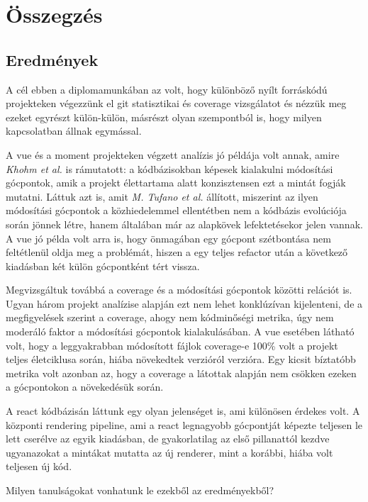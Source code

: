 \chapter{Összegzés}
\label{ch:sum}

\section{Eredmények}

A cél ebben a diplomamunkában az volt, hogy különböző nyílt forráskódú projekteken végezzünk el git statisztikai és coverage vizsgálatot és nézzük meg ezeket egyrészt külön-külön, másrészt olyan szempontból is, hogy milyen kapcsolatban állnak egymással.

A vue és a moment projekteken végzett analízis jó példája volt annak, amire \textit{Khohm et al.}\cite{khomh} is rámutatott: a kódbázisokban képesek kialakulni módosítási gócpontok, amik a projekt élettartama alatt konzisztensen ezt a mintát fogják mutatni. Láttuk azt is, amit \textit{M. Tufano et al.}\cite{codeSmells} állított, miszerint az ilyen módosítási gócpontok a közhiedelemmel ellentétben nem a kódbázis evolúciója során jönnek létre, hanem általában már az alapkövek lefektetésekor jelen vannak.
A vue jó példa volt arra is, hogy önmagában egy gócpont szétbontása nem feltétlenül oldja meg a problémát, hiszen a  egy teljes refactor után a következő kiadásban két külön gócpontként tért vissza.

Megvizsgáltuk továbbá a coverage és a módosítási gócpontok közötti relációt is. Ugyan három projekt analízise alapján ezt nem lehet konklúzívan kijelenteni, de a megfigyelések szerint a coverage, ahogy nem kódminőségi metrika, úgy nem moderáló faktor a módosítási gócpontok kialakulásában. A vue esetében látható volt, hogy a leggyakrabban módosított fájlok coverage-e 100\% volt a projekt teljes életciklusa során, hiába növekedtek verzióról verzióra. Egy kicsit bíztatóbb metrika volt azonban az, hogy a coverage a látottak alapján nem csökken ezeken a gócpontokon a növekedésük során.

A react kódbázisán láttunk egy olyan jelenséget is, ami különösen érdekes volt. A központi rendering pipeline, ami a react legnagyobb gócpontját képezte teljesen le lett cserélve az egyik kiadásban, de gyakorlatilag az első pillanattól kezdve ugyanazokat a mintákat mutatta az új renderer, mint a korábbi, hiába volt teljesen új kód.

Milyen tanulságokat vonhatunk le ezekből az eredményekből?

